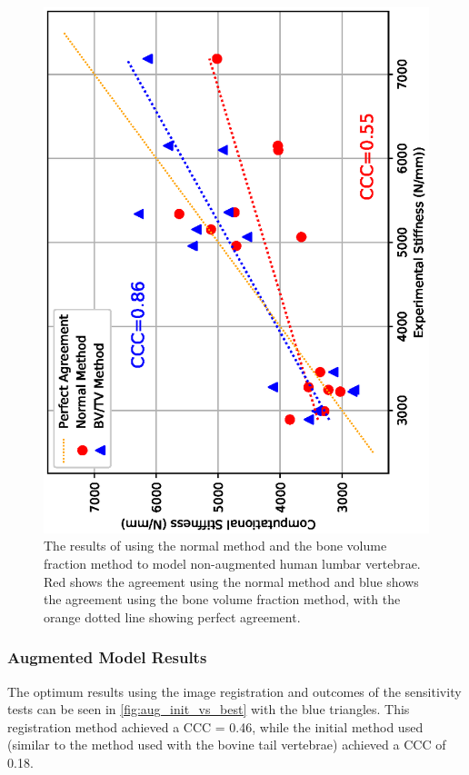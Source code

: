 \begin{figure}[h!]
  \centering
  \includegraphics[width=.65\textwidth, angle=270]{Chapters/Chapter_HT_images/intact_norm_bvtv}
	\caption{The results of using the normal method and the bone volume fraction method to model non-augmented human lumbar vertebrae. Red shows the agreement using the normal method and blue shows the agreement using the bone volume fraction method, with the orange dotted line showing perfect agreement.}
	\label{fig:intact_norm_bvtv}
\end{figure}



\subsubsection{Augmented Model Results}

The optimum results using the image registration and outcomes of the sensitivity tests can be seen in \cref{fig:aug_init_vs_best} with the blue triangles.
This registration method achieved a CCC = 0.46, while the initial method used (similar to the method used with the bovine tail vertebrae) achieved a CCC of 0.18.


